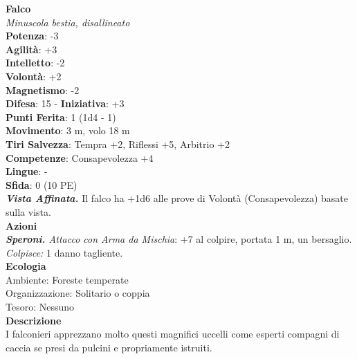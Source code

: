 \begin{multicols}{2}
\medskip\textbf{Falco}\\
\emph{Minuscola bestia, disallineato}\\
\textbf{Potenza}: -3\\
\textbf{Agilità}: +3\\
\textbf{Intelletto}: -2\\
\textbf{Volontà}: +2\\
\textbf{Magnetismo}: -2\\
\textbf{Difesa}: 15 - \textbf{Iniziativa}: +3\\
\textbf{Punti Ferita}: 1 (1d4 - 1)\\
\textbf{Movimento}: 3 m, volo 18 m\\
\textbf{Tiri Salvezza}: Tempra +2, Riflessi +5, Arbitrio +2 \\
\textbf{Competenze}: Consapevolezza +4\\
\textbf{Lingue}: -\\
\textbf{Sfida}: 0 (10 PE)\smallskip\\
\emph{\textbf{Vista Affinata.}} Il falco ha +1d6 alle prove di Volontà (Consapevolezza) basate sulla vista.\\
\smallskip\textbf{Azioni}\\
\emph{\textbf{Speroni.} Attacco con Arma da Mischia}: +7 al colpire, portata 1 m, un bersaglio.\\
\emph{Colpisce:} 1 danno tagliente. \\
\textbf{Ecologia}\\
Ambiente: Foreste temperate\\
Organizzazione: Solitario o coppia\\
Tesoro: Nessuno\\
\textbf{Descrizione}\\
I falconieri apprezzano molto questi magnifici uccelli come esperti compagni di caccia se presi da pulcini e propriamente istruiti. \\


\end{multicols}

